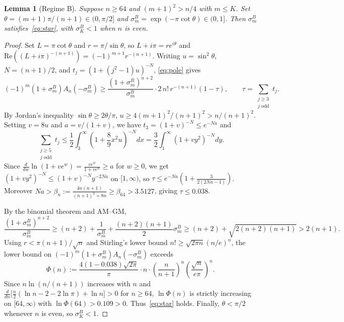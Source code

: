 \documentclass[11pt]{article}
\newtheorem{lemma}[theorem]{Lemma}
\begin{document}
\begin{lemma}[Regime B]\label{lem:B}
Suppose $n \ge 64$ and $(m + 1)^2 > n / 4$ with $m \le K$. Set $\theta = (m + 1)\pi / (n + 1) \in (0, \pi/2]$ and $\sigma^B_m = \exp(-\pi \cot \theta) \in (0, 1]$. Then $\sigma^B_m$ satisfies~\eqref{eq:star}, with $\sigma^B_K < 1$ when $n$ is even.
\end{lemma}

\begin{proof}
Set $L = \pi \cot \theta$ and $r = \pi / \sin\theta$, so $L + i\pi = r e^{i\theta}$ and $\mathrm{Re}((L + i\pi)^{-(n+1)}) = (-1)^{m+1} r^{-(n+1)}$. Writing $u = \sin^2\theta$, $N = (n + 1)/2$, and $t_j = (1 + (j^2 - 1)u)^{-N}$, \eqref{eq:pole} gives
\[
  (-1)^m(1 + \sigma^B_m) A_n(-\sigma^B_m) \ge \frac{(1 + \sigma^B_m)^{n+2}}{\sigma^B_m} \cdot 2\, n!\, r^{-(n+1)} (1 - \tau), \qquad \tau = \sum_{\substack{j \ge 3 \\ j\text{ odd}}} t_j.
\]
By Jordan's inequality $\sin\theta \ge 2\theta/\pi$, $u \ge 4(m+1)^2/(n+1)^2 > n/(n+1)^2$. Setting $v = 8u$ and $a = v/(1 + v)$, we have $t_3 = (1 + v)^{-N} \le e^{-Na}$ and
\[
  \sum_{\substack{j \ge 5 \\ j\text{ odd}}} t_j \le \frac{1}{2} \int_3^{\infty} \left(1 + \frac{8}{9} x^2 u\right)^{-N} dx = \frac{3}{2} \int_1^{\infty} (1 + v y^2)^{-N} dy.
\]
Since $\frac{d}{dw}\ln(1 + v e^w) = \frac{v e^w}{1 + v e^w} \ge a$ for $w \ge 0$, we get $(1 + v y^2)^{-N} \le (1 + v)^{-N} y^{-2Na}$ on $[1, \infty)$, so $\tau \le e^{-Na}(1 + \frac{3}{2(2Na - 1)})$. Moreover $Na > \beta_n := \frac{4n(n+1)}{(n+1)^2 + 8n} \ge \beta_{64} > 3.5127$, giving $\tau \le 0.038$.

By the binomial theorem and AM--GM,
\[
  \frac{(1 + \sigma^B_m)^{n+2}}{\sigma^B_m} \ge (n + 2) + \frac{1}{\sigma^B_m} + \frac{(n + 2)(n + 1)}{2}\sigma^B_m \ge (n + 2) + \sqrt{2(n + 2)(n + 1)} > 2(n + 1).
\]
Using $r < \pi(n + 1)/\sqrt{n}$ and Stirling's lower bound $n! \ge \sqrt{2\pi n}(n/e)^n$, the lower bound on $(-1)^m(1 + \sigma^B_m) A_n(-\sigma^B_m)$ exceeds
\[
  \Phi(n) := \frac{4(1 - 0.038)\sqrt{2\pi}}{\pi} \cdot n \cdot \left(\frac{n}{n + 1}\right)^n \left(\frac{\sqrt{n}}{e\pi}\right)^n.
\]
Since $n\ln(n/(n+1))$ increases with $n$ and $\frac{d}{dn}\bigl[\frac{n}{2}(\ln n - 2 - 2\ln\pi) + \ln n\bigr] > 0$ for $n \ge 64$, $\ln \Phi(n)$ is strictly increasing on $[64, \infty)$ with $\ln \Phi(64) > 0.109 > 0$. Thus~\eqref{eq:star} holds. Finally, $\theta < \pi/2$ whenever $n$ is even, so $\sigma^B_K < 1$.
\end{proof}
\end{document}
